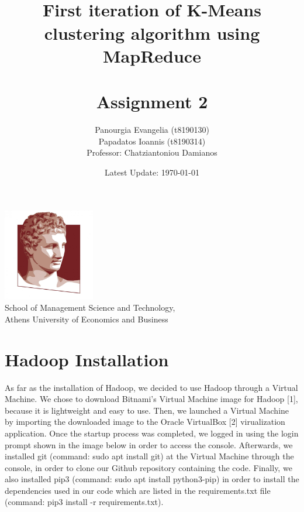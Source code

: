 \documentclass[11pt]{article}
\begin{document}
	\begin{titlepage}
		\title{\hrulefill\\
			\vspace{5mm}
			{\Huge \textbf{First iteration of K-Means clustering algorithm using MapReduce}} \\ \hrulefill\\
			\vspace{10mm}
			{\Large {{Assignment 2}
		}}}
		\author{Panourgia Evangelia (t8190130)\\
			Papadatos Ioannis (t8190314)\\
			Professor: Chatziantoniou Damianos}
		\date{Latest Update: \today}
		\maketitle
		
		\thispagestyle{empty}
		\begin{center}
			\includegraphics[width=0.3\textwidth]{./aueblogo.jpg}\\
			\vspace{10mm}
			School of Management Science and Technology,\\ Athens University of Economics and Business
		\end{center}
	\end{titlepage}
	\noindent
	
	\tableofcontents	
	
	\newpage
	\section{Hadoop Installation}
	As far as the installation of Hadoop, we decided to use Hadoop through a Virtual Machine. We chose to download Bitnami's Virtual Machine image for Hadoop [1], because it is lightweight and easy to use. Then, we launched a Virtual Machine by importing the downloaded image to the Oracle VirtualBox [2] virualization application. Once the startup process was completed, we logged in using the login prompt shown in the image below in order to access the console. Afterwards, we installed git (command: sudo apt install git) at the Virtual Machine through the console, in order to clone our Github repository containing the code. Finally, we also installed pip3 (command: sudo apt install python3-pip) in order to install the dependencies used in our code which are listed in the requirements.txt file (command: pip3 install -r requirements.txt).
	 
\end{document}
